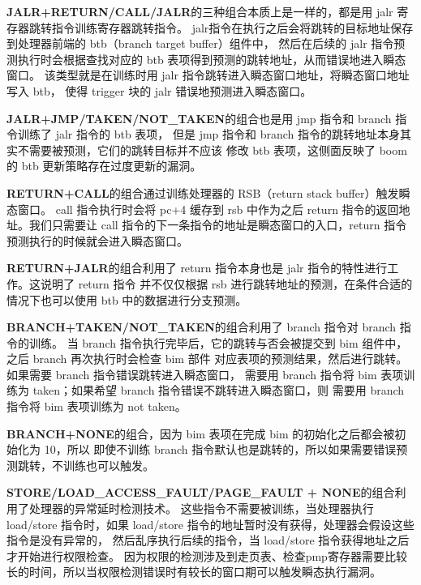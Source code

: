 \textbf{JALR+RETURN/CALL/JALR}的三种组合本质上是一样的，都是用 jalr 寄存器跳转指令训练寄存器跳转指令。
jalr指令在执行之后会将跳转的目标地址保存到处理器前端的 btb（branch target buffer）组件中，
然后在后续的 jalr 指令预测执行时会根据查找对应的 btb 表项得到预测的跳转地址，从而错误地进入瞬态窗口。
该类型就是在训练时用 jalr 指令跳转进入瞬态窗口地址，将瞬态窗口地址写入 btb，
使得 trigger 块的 jalr 错误地预测进入瞬态窗口。\par

\textbf{JALR+JMP/TAKEN/NOT\_TAKEN}的组合也是用 jmp 指令和 branch 指令训练了 jalr 指令的 btb 表项，
但是 jmp 指令和 branch 指令的跳转地址本身其实不需要被预测，它们的跳转目标并不应该
修改 btb 表项，这侧面反映了 boom 的 btb 更新策略存在过度更新的漏洞。\par

\textbf{RETURN+CALL}的组合通过训练处理器的 RSB（return stack buffer）触发瞬态窗口。
call 指令执行时会将 pc+4 缓存到 rsb 中作为之后 return 指令的返回地址。我们只需要让
call 指令的下一条指令的地址是瞬态窗口的入口，return 指令预测执行的时候就会进入瞬态窗口。\par

\textbf{RETURN+JALR}的组合利用了 return 指令本身也是 jalr 指令的特性进行工作。这说明了 return 指令
并不仅仅根据 rsb 进行跳转地址的预测，在条件合适的情况下也可以使用 btb 中的数据进行分支预测。\par

\textbf{BRANCH+TAKEN/NOT\_TAKEN}的组合利用了 branch 指令对 branch 指令的训练。
当 branch 指令执行完毕后，它的跳转与否会被提交到 bim 组件中，之后 branch 再次执行时会检查 bim 部件
对应表项的预测结果，然后进行跳转。如果需要 branch 指令错误跳转进入瞬态窗口，
需要用 branch 指令将 bim 表项训练为 taken；如果希望 branch 指令错误不跳转进入瞬态窗口，则
需要用 branch 指令将 bim 表项训练为 not taken。\par

\textbf{BRANCH+NONE}的组合，因为 bim 表项在完成 bim 的初始化之后都会被初始化为 10，所以
即使不训练 branch 指令默认也是跳转的，所以如果需要错误预测跳转，不训练也可以触发。\par

\textbf{STORE/LOAD\_ACCESS\_FAULT/PAGE\_FAULT + NONE}的组合利用了处理器的异常延时检测技术。
这些指令不需要被训练，当处理器执行 load/store 指令时，如果 load/store 指令的地址暂时没有获得，处理器会假设这些指令是没有异常的，
然后乱序执行后续的指令，当 load/store 指令获得地址之后才开始进行权限检查。
因为权限的检测涉及到走页表、检查pmp寄存器需要比较长的时间，所以当权限检测错误时有较长的窗口期可以触发瞬态执行漏洞。\par

